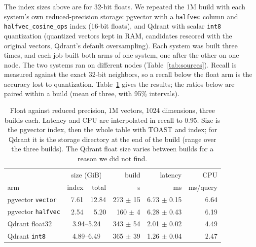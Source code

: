 \documentclass[sigconf, nonacm]{acmart}
\begin{document}
The index sizes above are for 32-bit floats. We repeated the 1M build with each system's own
reduced-precision storage: pgvector with a \texttt{halfvec} column and \texttt{halfvec\_cosine\_ops}
index (16-bit floats), and Qdrant with scalar \texttt{int8} quantization (quantized vectors kept in
RAM, candidates rescored with the original vectors, Qdrant's default oversampling). Each system
was built three times, and each job built both arms of one system, one after the other on one node.
The two systems ran on different nodes (Table~\ref{tab:sources}). Recall is measured against the exact
32-bit neighbors, so a recall below the float arm is the accuracy lost to quantization.
Table~\ref{tab:quant} gives the results; the ratios below are paired within a build
(mean of three, with 95\% intervals).

\begin{table}[t]
  \caption{Float against reduced precision, 1M vectors, 1024 dimensions, three builds each.
  Latency and CPU are interpolated in recall to 0.95. Size is the pgvector index, then the
  whole table with TOAST and index; for Qdrant it is the storage directory at the end of the
  build (range over the three builds). The Qdrant float size varies between builds for a
  reason we did not find.}
  \label{tab:quant}
  \small
  \begin{tabular}{@{}lrrrrr@{}}
    \toprule
    & \multicolumn{2}{c}{size (GiB)} & build & latency & CPU \\
    arm & index & total & s & ms & ms/query \\
    \midrule
    pgvector \texttt{vector} & 7.61 & 12.84 & 273 $\pm$ 15 & 6.73 $\pm$ 0.15 & 6.64 \\
    pgvector \texttt{halfvec} & 2.54 & 5.20 & 160 $\pm$ 4 & 6.28 $\pm$ 0.43 & 6.19 \\
    Qdrant float32 & \multicolumn{2}{c}{3.94--5.24} & 343 $\pm$ 54 & 2.01 $\pm$ 0.02 & 4.49 \\
    Qdrant \texttt{int8} & \multicolumn{2}{c}{4.89--6.49} & 365 $\pm$ 39 & 1.26 $\pm$ 0.04 & 2.47 \\
    \bottomrule
  \end{tabular}
\end{table}
\end{document}
